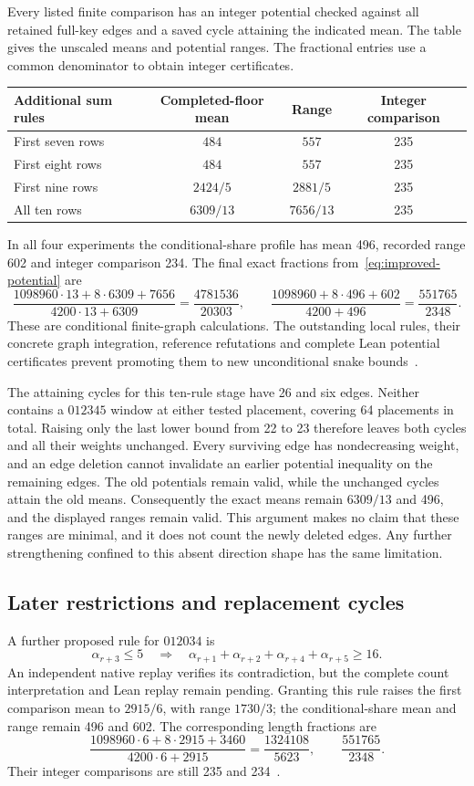 \documentclass[11pt,a4paper]{article}
\theoremstyle{definition}
\theoremstyle{remark}
\begin{document}
Every listed finite comparison has an integer potential checked against
all retained full-key edges and a saved cycle attaining the indicated
mean. The table gives the unscaled means and potential ranges. The
fractional entries use a common denominator to obtain integer certificates.
\begin{center}\small
\begin{tabular}{l c c c}
\toprule
Additional sum rules & Completed-floor mean & Range & Integer comparison\\\midrule
First seven rows & $484$ & $557$ & 235\\
First eight rows & $484$ & $557$ & 235\\
First nine rows & $2424/5$ & $2881/5$ & 235\\
All ten rows & $6309/13$ & $7656/13$ & 235\\\bottomrule
\end{tabular}
\end{center}
In all four experiments the conditional-share profile has mean 496,
recorded range 602 and integer comparison 234. The final exact fractions
from~\eqref{eq:improved-potential} are
\[
\frac{1098960\cdot13+8\cdot6309+7656}{4200\cdot13+6309}
=\frac{4781536}{20303},\qquad
\frac{1098960+8\cdot496+602}{4200+496}
=\frac{551765}{2348}.
\]
These are conditional finite-graph calculations. The outstanding local
rules, their concrete graph integration, reference refutations and complete
Lean potential certificates prevent promoting them to new unconditional
snake bounds~\cite{sumbudgetarchive,pairbudgetarchive,totalcountarchive}.

The attaining cycles for this ten-rule stage have 26 and six edges. Neither contains a
$012345$ window at either tested placement, covering 64 placements in
total. Raising only the last lower bound from 22 to 23 therefore leaves
both cycles and all their weights unchanged. Every surviving edge has
nondecreasing weight, and an edge deletion cannot invalidate an earlier
potential inequality on the remaining edges. The old potentials remain
valid, while the unchanged cycles attain the old means. Consequently the
exact means remain $6309/13$ and 496, and the displayed ranges remain
valid. This argument makes no claim that these ranges are minimal, and
it does not count the newly deleted edges. Any further strengthening
confined to this absent direction shape has the same limitation.

\subsection{Later restrictions and replacement cycles}
A further proposed rule for $012034$ is
\[
\alpha_{r+3}\le5\quad\Longrightarrow\quad
\alpha_{r+1}+\alpha_{r+2}+\alpha_{r+4}+\alpha_{r+5}\ge16.
\]
An independent native replay verifies its contradiction, but the complete
count interpretation and Lean replay remain pending. Granting this rule
raises the first comparison mean to $2915/6$, with range $1730/3$; the
conditional-share mean and range remain 496 and 602. The corresponding
length fractions are
\[
\frac{1098960\cdot6+8\cdot2915+3460}{4200\cdot6+2915}
=\frac{1324108}{5623},\qquad \frac{551765}{2348}.
\]
Their integer comparisons are still 235 and 234~\cite{latersumarchive}.
\end{document}
